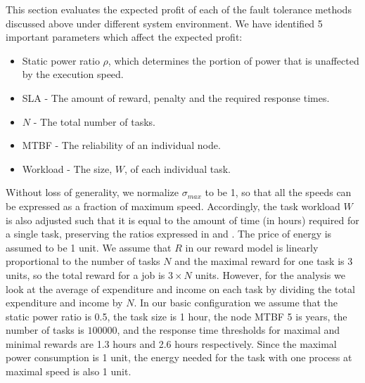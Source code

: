 \noindent This section evaluates the expected profit of each of the fault tolerance
methods discussed above under different system environment. We have identified 5
important parameters which affect the expected profit:
\begin{itemize}
\item Static power ratio $\rho$, which determines the portion of power that is unaffected by the execution speed.
\item SLA - The amount of reward, penalty and the required response times.
\item $N$ - The total number of tasks.
\item MTBF - The reliability of an individual node.
\item Workload - The size, $W$, of each individual task.
\end{itemize}


%



Without loss of generality, we normalize $\sigma_{max}$ to be 1, so
that all the speeds can be expressed as a fraction of maximum
speed. Accordingly, the task workload $W$ is also adjusted such that
it is equal to the amount of time (in hours) required for a single
task, preserving the ratios expressed in
 and . The price of
energy is assumed to be 1 unit. We assume that $R$ in our reward model
is linearly proportional to the number of tasks $N$ and the maximal
reward for one task is 3 units, so the total reward for a job is $3
\times N$ units.  However, for the analysis we look
at the average of expenditure and income on each task by dividing the
total expenditure and income by $N$. In our basic configuration we
assume that the static power ratio is 0.5, the task size is 1 hour, the node MTBF 5 is
years, the number of tasks is $100000$, and the response time thresholds for
maximal and minimal rewards are 1.3 hours and 2.6 hours
respectively. Since the maximal power consumption is 1 unit, the
energy needed for the task with one process at maximal speed is also 1
unit. 

